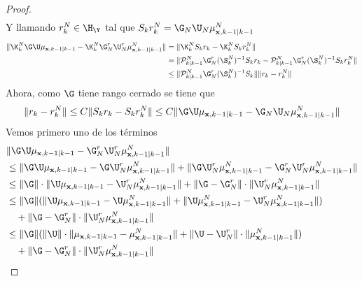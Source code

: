 \begin{proof}
\begin{equation*}
\begin{aligned}
		\end{aligned}
	\end{equation*}
	Y llamando $r_k^N \in \H_\Y$ tal que $S_k r_k^N = \G_N  \U_N  \mu_{\mathbf{x},k-1|k-1}^N$
	\begin{equation*}
		\begin{aligned}
			 \| \K_k^N \G \U \mu_{\mathbf{x}, k-1 | k-1} - \K_k^N \G_N^r \U_N^r \mu_{\mathbf{x}, k-1 | k-1}^N \| 
			 & = \| \K_k^N S_k r_k - \K_k^N S_k r_k^N \| \\
			 & = \|  \mathcal{P}_{k|k-1}^N \G_N^r (\S_k^N)^{-1} S_k r_k -  \mathcal{P}_{k|k-1}^N \G_N^r (\S_k^N)^{-1} S_k r_k^N  \| \\
			 & \leq \| \mathcal{P}_{k|k-1}^N \G_N^r (\S_k^N)^{-1} S_k \| \| r_k - r_k^N \|
		\end{aligned}
	\end{equation*}
	Ahora, como $\G$ tiene rango cerrado \cite{Philipp2024} se tiene que 
	\begin{equation*}
	  \| r_k - r_k^N\| \leq C \| S_k r_k - S_k r_k^N \| \leq C \| \G \U  \mu_{\mathbf{x},k-1|k-1} - \G_N  \U_N  \mu_{\mathbf{x},k-1|k-1}^N  \|
	\end{equation*}
	Vemos primero uno de los términos
	\begin{equation*}
		\begin{aligned}
			& \|   \G  \U  \mu_{\mathbf{x},k-1|k-1} -  \G_N^r \U_N^r \mu_{\mathbf{x}, k-1 | k-1}^N  \| \\
			& \leq \|   \G  \U  \mu_{\mathbf{x},k-1|k-1} -  \G \U_N^r \mu_{\mathbf{x}, k-1 | k-1}^N  \| + \| \G  \U_N^r \mu_{\mathbf{x}, k-1 | k-1}^N-  \G_N^r \U_N^r \mu_{\mathbf{x}, k-1 | k-1}^N  \| \\
			& \leq \| \G \| \cdot \| \U \mu_{\mathbf{x}, k-1 | k-1} - \U_N^r \mu_{\mathbf{x}, k-1 | k-1}^N\| + \| \G - \G_N^r \| \cdot \| \U_N^r \mu_{\mathbf{x}, k-1 | k-1}^N \| \\
			& \leq \| \G \| ( \| \U \mu_{\mathbf{x}, k-1 | k-1} - \U \mu_{\mathbf{x}, k-1 | k-1}^N\| +  \| \U \mu_{\mathbf{x}, k-1 | k-1}^N - \U_N^r \mu_{\mathbf{x}, k-1 | k-1}^N\| ) \\
			& \quad + \| \G - \G_N^r \| \cdot \| \U_N^r \mu_{\mathbf{x}, k-1 | k-1}^N \| \\
			& \leq \| \G \| ( \| \U \| \cdot \| \mu_{\mathbf{x}, k-1 | k-1} -  \mu_{\mathbf{x}, k-1 | k-1}^N\| +  \| \U - \U_N^r \| \cdot \| \mu_{\mathbf{x}, k-1 | k-1}^N \| ) \\
			& \quad + \| \G - \G_N^r \| \cdot \| \U_N^r \mu_{\mathbf{x}, k-1 | k-1}^N \| 
		\end{aligned}
	\end{equation*}



\end{proof}
